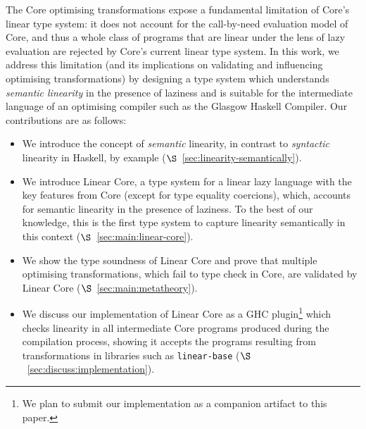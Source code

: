 \documentclass[acmsmall,review,anonymous]{acmart}
\begin{document}

The Core optimising transformations expose a fundamental limitation of Core's
linear type system: it does not account for the call-by-need evaluation model
of Core, and thus a whole class of programs that are linear under the lens of
lazy evaluation are rejected by Core's current linear type system.
%
In this work, we address this limitation (and its implications on validating
and influencing optimising transformations) by designing a type system which
understands \emph{semantic linearity} in the presence of laziness and is suitable for
the intermediate language of an optimising compiler such as the
Glasgow Haskell Compiler.
%
Our contributions are as follows:
%
\begin{itemize}

\item We introduce the concept of \emph{semantic} linearity, in
contrast to \emph{syntactic} linearity in Haskell, by example
($\S$~\ref{sec:linearity-semantically}).

\item We introduce Linear Core, a type system for a linear lazy language with
the key features from Core (except for type equality coercions), which,
accounts for semantic linearity in the presence of laziness. To the
best of our knowledge, this is the first type system to capture linearity
semantically in this context
($\S$~\ref{sec:main:linear-core}).

\item We show the type soundness of Linear Core and prove that
  multiple optimising transformations, which
fail to type check in Core, are validated by Linear
Core ($\S$~\ref{sec:main:metatheory}).

\item We discuss our implementation of Linear Core as a GHC
  plugin\footnote{We plan to submit our implementation as a companion
    artifact to this paper.} which checks linearity in
all intermediate Core programs produced during the compilation process, showing
it accepts the programs resulting from transformations in libraries such as
\texttt{linear-base} ($\S$~\ref{sec:discuss:implementation}).

\end{itemize}
\end{document}
